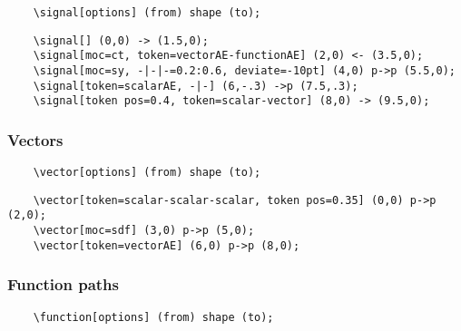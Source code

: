 \documentclass[10pt]{article}
\begin{document}
\begin{verbatim}
	\signal[options] (from) shape (to);	
\end{verbatim}

\begin{verbatim}
	\signal[] (0,0) -> (1.5,0); 
	\signal[moc=ct, token=vectorAE-functionAE] (2,0) <- (3.5,0);
	\signal[moc=sy, -|-|-=0.2:0.6, deviate=-10pt] (4,0) p->p (5.5,0);
	\signal[token=scalarAE, -|-] (6,-.3) ->p (7.5,.3);
	\signal[token pos=0.4, token=scalar-vector] (8,0) -> (9.5,0);
\end{verbatim}
\begin{figure}[htb!]\centering
{}
\end{figure}

\subsubsection{Vectors}

\begin{verbatim}
	\vector[options] (from) shape (to);	
\end{verbatim}

\begin{verbatim}
	\vector[token=scalar-scalar-scalar, token pos=0.35] (0,0) p->p (2,0);	
	\vector[moc=sdf] (3,0) p->p (5,0);
	\vector[token=vectorAE] (6,0) p->p (8,0);
\end{verbatim}
\begin{figure}[htb!]\centering
{}
\end{figure}

\subsubsection{Function paths}

\begin{verbatim}
	\function[options] (from) shape (to);	
\end{verbatim}
\end{document}

